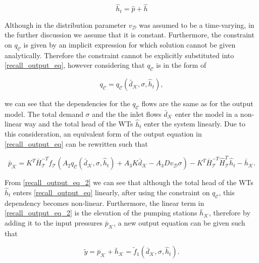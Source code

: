  \begin{equation}
\label{totalhead_output_eq}
\hat{h}_t = \hat{p} + \hat{h}
\end{equation} 

Although in  the distribution parameter $v_{\mathcal{D}}$ was assumed to be a time-varying, in the further discussion we assume that it is constant. Furthermore, the constraint on $q_\mathcal{C}$ is given by an implicit expression for which solution cannot be given analytically. Therefore the constraint cannot be explicitly substituted into \eqref{recall_output_eq}, however considering that $q_\mathcal{C}$ is in the form of

 \begin{equation}
\label{qc_abstraction}
q_\mathcal{C} = q_\mathcal{C}(\bar{d}_{\mathcal{K}}, \sigma, \hat{h}_t ),
\end{equation} 

we can see that the dependencies for the $q_\mathcal{C}$ flows are the same as for the output model. The total demand $\sigma$ and the the inlet flows $\bar{d}_{\mathcal{K}}$ enter the model in a non-linear way and the total head of the WTs $\hat{h}_t$ enter the system linearly. Due to this consideration, an equivalent form of the output equation in \eqref{recall_output_eq} can be  rewritten such that

 \begin{equation}
  \label{recall_output_eq_2}
  \bar{p}_{\mathcal{K}} = K^T \bar{H}^{-T}_{\mathcal{T}}f_{\mathcal{T}}(A_2 q_\mathcal{C}(\bar{d}_{\mathcal{K}}, \sigma, \hat{h}_t ) + A_3 K \bar{d}_{\mathcal{K}} - A_3 D v_{\mathcal{D}} \sigma) - K^T\bar{H}^{-T}_{\mathcal{T}}\hat{H}^{T}_{\mathcal{T}} \hat{h}_t - \bar{h}_{\mathcal{K}}. 
\end{equation} 

From \eqref{recall_output_eq_2} we can see that although the total head of the WTs $\hat{h}_t$ enters \eqref{recall_output_eq} linearly, after using the constraint on $q_\mathcal{C}$, this dependency becomes non-linear. Furthermore, the linear term in \eqref{recall_output_eq_2} is the elevation of the pumping stations $\bar{h}_{\mathcal{K}}$, therefore by adding it to the input pressures $\bar{p}_{\mathcal{K}}$, a new output equation can be given such that 

 \begin{equation}
  \label{recall_output_eq_3}
  \tilde{y} = \bar{p}_{\mathcal{K}} + \bar{h}_{\mathcal{K}} = \tilde{f}_1(\bar{d}_{\mathcal{K}}, \sigma, \hat{h}_t ). 
\end{equation} 

